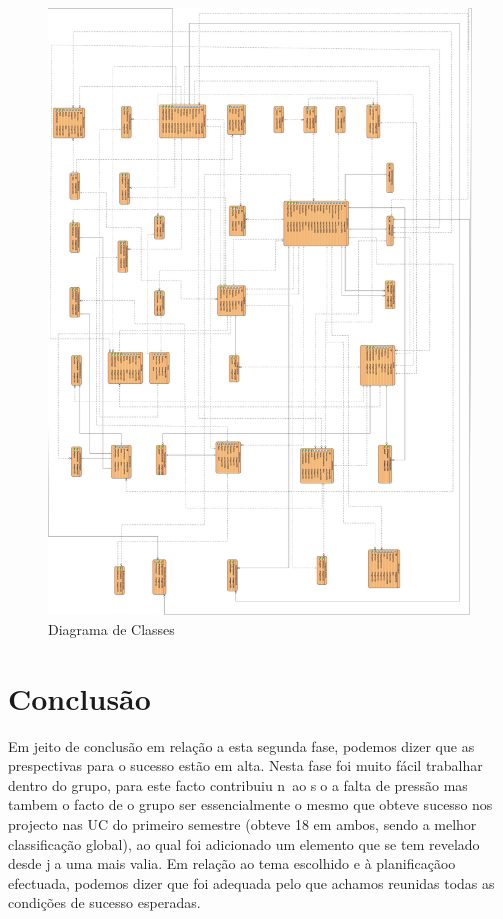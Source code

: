 ﻿\documentclass[12pt,a4paper]{article}
\begin{document}
\begin{figure}[h!]
\centering
\includegraphics[scale=0.15]{basedados}
\caption{Diagrama de Classes} 
\end{figure} 

\clearpage
\section{Conclusão} 
Em jeito de conclusão em relação a esta segunda fase, podemos dizer que as prespectivas para
o sucesso estão em alta.
Nesta fase foi muito fácil trabalhar dentro do grupo, para este facto contribuiu n~ao so a falta
de pressão mas tambem o facto de o grupo ser essencialmente o mesmo que obteve sucesso
nos projecto nas UC do primeiro semestre (obteve 18 em ambos, sendo a melhor classificação global),
ao qual foi adicionado um elemento que se tem revelado desde ja uma mais valia.
Em relação ao tema escolhido e à planificaçãoo efectuada, podemos dizer que foi adequada
pelo que achamos reunidas todas as condições de sucesso esperadas. 
\end{document}
